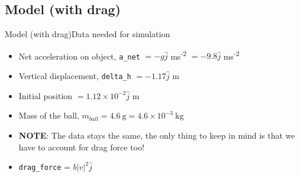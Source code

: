 




\subsection{Model (with drag)}
\begin{frame}{Model (with drag)}{Data needed for simulation}
\begin{itemize}
    \item Net acceleration on object, \texttt{a\_net} \( = -g\hat{j}\)
     ms\textsuperscript{-2} \( = -9.8\hat{j}\) ms\textsuperscript{-2}
    \item Vertical displacement, \texttt{delta\_h} \( = -1.17\hat{j}\) m
    \item Initial position \( = 1.12\times 10^{-2} \hat{j} \) m
    \item Mass of the ball, \(m_{ball} = 4.6\ \mathrm{g} = 4.6 \times 10^{-3}
    \ \mathrm{kg}\)
    \item \textbf{NOTE}: The data stays the same, the only thing to keep in 
    mind is that we have to account for drag force too!
    \item \texttt{drag\_force} = \(b|v|^2 \hat{j}\)
\end{itemize}
\end{frame}

